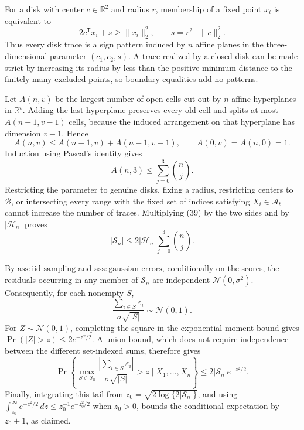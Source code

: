 For a disk with center \(c\in\mathbb R^2\) and radius \(r\), membership of a fixed point \(x_i\) is equivalent to
\[
 2c^{\mathsf T}x_i+s\ge\|x_i\|_2^2,
 \qquad s=r^2-\|c\|_2^2.
\]
Thus every disk trace is a sign pattern induced by \(n\) affine planes in the three-dimensional parameter \((c_1,c_2,s)\).  A trace realized by a closed disk can be made strict by increasing its radius by less than the positive minimum distance to the finitely many excluded points, so boundary equalities add no patterns.

Let \(A(n,v)\) be the largest number of open cells cut out by \(n\) affine hyperplanes in \(\mathbb R^v\).  Adding the last hyperplane preserves every old cell and splits at most \(A(n-1,v-1)\) cells, because the induced arrangement on that hyperplane has dimension \(v-1\).  Hence
\[
 A(n,v)\le A(n-1,v)+A(n-1,v-1),
 \qquad A(0,v)=A(n,0)=1.
\]
Induction using Pascal's identity gives
\[
 A(n,3)\le\sum_{j=0}^3\binom nj. \tag{39}
\]
Restricting the parameter to genuine disks, fixing a radius, restricting centers to \(\mathcal B\), or intersecting every range with the fixed set of indices satisfying \(X_i\in\mathcal A_t\) cannot increase the number of traces.  Multiplying (39) by the two sides and by \(|\mathcal H_n|\) proves
\[
 |\mathscr S_n|\le2|\mathcal H_n|\sum_{j=0}^3\binom nj.
\]

By \(\mathrm{ass:iid\text{-}sampling}\) and \(\mathrm{ass:gaussian\text{-}errors}\), conditionally on the scores, the residuals occurring in any member of \(\mathscr S_n\) are independent \(\mathcal N(0,\sigma^2)\).  Consequently, for each nonempty \(S\),
\[
 \frac{\sum_{i\in S}\varepsilon_i}{\sigma\sqrt{|S|}}\sim\mathcal N(0,1).
\]
For \(Z\sim\mathcal N(0,1)\), completing the square in the exponential-moment bound gives \(\Pr(|Z|>z)\le2e^{-z^2/2}\).  A union bound, which does not require independence between the different set-indexed sums, therefore gives
\[
 \Pr\left\{\max_{S\in\mathscr S_n}\frac{|\sum_{i\in S}\varepsilon_i|}{\sigma\sqrt{|S|}}>z\mid X_1,\ldots,X_n\right\}
 \le2|\mathscr S_n|e^{-z^2/2}.
\]
Finally, integrating this tail from \(z_0=\sqrt{2\log\{2|\mathscr S_n|\}}\), and using \(\int_{z_0}^{\infty}e^{-z^2/2}\,dz\le z_0^{-1}e^{-z_0^2/2}\) when \(z_0>0\), bounds the conditional expectation by \(z_0+1\), as claimed.